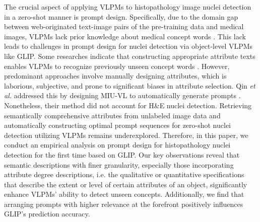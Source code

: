 \documentclass[journal,twoside,web]{ieeecolor}
\begin{document}
The crucial aspect of applying VLPMs to histopathology image nuclei detection in a zero-shot manner is prompt design. Specifically, due to the domain gap between web-originated text-image pairs of the pre-training data and medical images, VLPMs lack prior knowledge about medical concept words \cite{qin2022medical}. This lack leads to challenges in prompt design for nuclei detection via object-level VLPMs like GLIP. Some researches indicate that constructing appropriate attribute texts enables VLPMs to recognize previously unseen concept words \cite{li2022grounded,yamada2022lemons}. However, predominant approaches involve manually designing attributes, which is laborious, subjective, and prone to significant biases in attribute selection. Qin \textit{et al.} addressed this by designing MIU-VL to automatically generate prompts \cite{qin2022medical}. Nonetheless, their method did not account for H\&E nuclei detection. Retrieving semantically comprehensive attributes from unlabeled image data and automatically constructing optimal prompt sequences for zero-shot nuclei detection utilizing VLPMs remains underexplored. Therefore, in this paper, we conduct an empirical analysis on prompt design for histopathology nuclei detection for the first time based on GLIP. Our key observations reveal that semantic descriptions with finer granularity, especially those incorporating attribute degree descriptions, i.e. the qualitative or quantitative specifications that describe the extent or level of certain attributes of an object, significantly enhance VLPMs' ability to detect unseen concepts. Additionally, we find that arranging prompts with higher relevance at the forefront positively influences GLIP's prediction accuracy.

\end{document}
